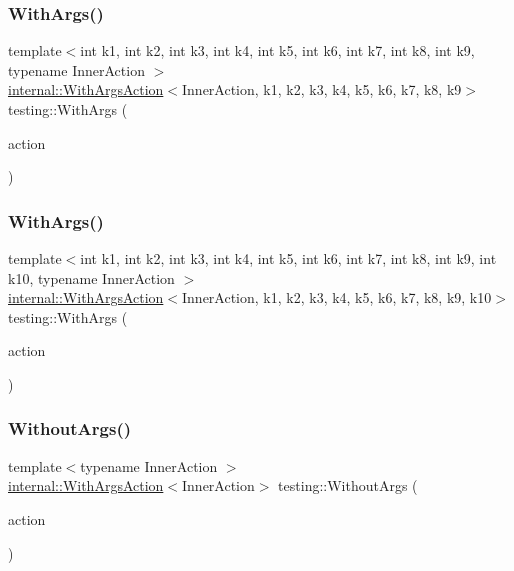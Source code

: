 \subsubsection{\texorpdfstring{With\+Args()}{WithArgs()}\hspace{0.1cm}{\footnotesize\ttfamily [9/10]}}
{\footnotesize\ttfamily template$<$int k1, int k2, int k3, int k4, int k5, int k6, int k7, int k8, int k9, typename Inner\+Action $>$ \\
\hyperlink{classtesting_1_1internal_1_1_with_args_action}{internal\+::\+With\+Args\+Action}$<$Inner\+Action, k1, k2, k3, k4, k5, k6, k7, k8, k9$>$ testing\+::\+With\+Args (\begin{DoxyParamCaption}\item[{const Inner\+Action \&}]{action }\end{DoxyParamCaption})\hspace{0.3cm}{\ttfamily [inline]}}

\mbox{\label{namespacetesting_a768a620ad07c6b5822201fa4f15fb4f0}} 
\subsubsection{\texorpdfstring{With\+Args()}{WithArgs()}\hspace{0.1cm}{\footnotesize\ttfamily [10/10]}}
{\footnotesize\ttfamily template$<$int k1, int k2, int k3, int k4, int k5, int k6, int k7, int k8, int k9, int k10, typename Inner\+Action $>$ \\
\hyperlink{classtesting_1_1internal_1_1_with_args_action}{internal\+::\+With\+Args\+Action}$<$Inner\+Action, k1, k2, k3, k4, k5, k6, k7, k8, k9, k10$>$ testing\+::\+With\+Args (\begin{DoxyParamCaption}\item[{const Inner\+Action \&}]{action }\end{DoxyParamCaption})\hspace{0.3cm}{\ttfamily [inline]}}

\mbox{\label{namespacetesting_aeac85f74bd11112f69142e92e3a50780}} 
\subsubsection{\texorpdfstring{Without\+Args()}{WithoutArgs()}}
{\footnotesize\ttfamily template$<$typename Inner\+Action $>$ \\
\hyperlink{classtesting_1_1internal_1_1_with_args_action}{internal\+::\+With\+Args\+Action}$<$Inner\+Action$>$ testing\+::\+Without\+Args (\begin{DoxyParamCaption}\item[{const Inner\+Action \&}]{action }\end{DoxyParamCaption})\hspace{0.3cm}{\ttfamily [inline]}}



